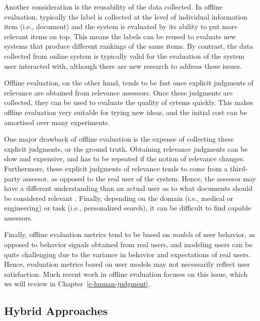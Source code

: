 Another consideration is the reusability of the data collected. In offline evaluation, typically the label is collected at the level of individual information item (i.e., document) and the system is evaluated by its ability to put more relevant items on top. This means the labels can be reused to evaluate new systems that produce different rankings of the same items. By contrast, the data collected from online system is typically valid for the evaluation of the system user interacted with, although there are new research to address these issues.

Offline evaluation, on the other hand, tends to be fast once explicit judgments of relevance are obtained from relevance assessors. Once these judgments are collected, they can be used to evaluate the quality of sytems quickly. This makes offline evaluation very suitable for trying new ideas, and the initial cost can be amortised over many experiments. %

One major drawback of offline evaluation is the expense of collecting these explicit judgments, or the ground truth. Obtaining relevance judgments can be slow and expensive, and has to be repeated if the notion of relevance changes. Furthermore, these explicit judgments of relevance tends to come from a third-party assessor, as opposed to the real user of the system. Hence, the assessor may have a different understanding than an actual user as to what documents should be considered relevant . Finally, depending on the domain (i.e., medical or engineering) or task (i.e., personalized search), it can be difficult to find capable assessors. 

Finally, offline evaluation metrics tend to be based on \emph{models} of user behavior, as opposed to behavior signals obtained from real users, and modeling users can be quite challenging due to the variance in behavior and expectations of real users. Hence, evaluation metrics based on user models may not necessarily reflect user satisfaction. Much recent work in offline evaluation focuses on this issue, which we will review in Chapter~\ref{c-human-judgment}.

\subsection{Hybrid Approaches}

